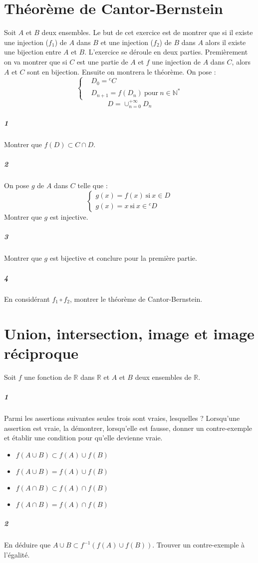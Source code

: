 \documentclass[10pt,a4paper]{article}
\begin{document}
\section{Théorème de Cantor-Bernstein}
Soit $A$ et $B$ deux ensembles. Le but de cet exercice est de montrer que si il existe une injection ($f_1$) de $A$ dans $B$ et une injection ($f_2$) de $B$ dans $A$ alors il existe une bijection entre $A$ et $B$. L'exercice se déroule en deux parties. Premièrement on va montrer que si $C$ est une partie de $A$ et $f$ une injection de $A$ dans $C$, alors $A$ et $C$ sont en bijection. Ensuite on montrera le théorème. On pose :
\begin{equation*}
\left\{
\begin{aligned}
&D_0={}^c C \\
&D_{n+1}=f(D_n) \ \text{pour} \ n \in \mathbb{N}^{*}
\end{aligned}\right.
\end{equation*}
\begin{equation*}
D=\cup_{n=0}^{+\infty} D_n
\end{equation*}
\subparagraph{1}Montrer que $f(D) \subset C \cap D$.
\subparagraph{2}On pose $g$ de $A$ dans $C$ telle que :
\begin{equation*}
\left\{
\begin{aligned}
g(x)=f(x) \ \text{si} \ x \in D \\
g(x)=x \ \text{si} \ x \in {}^cD
\end{aligned}\right.
\end{equation*}
Montrer que $g$ est injective.
\subparagraph{3}Montrer que $g$ est bijective et conclure pour la première partie.
\subparagraph{4}En considérant $f_1 \circ f_2$, montrer le théorème de Cantor-Bernstein.

\section{Union, intersection, image et image réciproque}
Soit $f$ une fonction de $\mathbb{R}$ dans $\mathbb{R}$ et $A$ et $B$ deux ensembles de $\mathbb{R}$.
\subparagraph{1} Parmi les assertions suivantes seules trois sont vraies, lesquelles ? Lorsqu'une assertion est vraie, la démontrer, lorsqu'elle est fausse, donner un contre-exemple et établir une condition pour qu'elle devienne vraie.
\begin{itemize}
\item $f(A \cup B) \subset f(A) \cup f(B)$
\item $f(A \cup B) = f(A) \cup f(B)$
\item $f(A \cap B) \subset f(A) \cap f(B)$
\item $f(A \cap B) = f(A) \cap f(B)$
\end{itemize}
\subparagraph{2}En déduire que $ A \cup B\subset f^{-1}(f(A) \cup f(B))$. Trouver un contre-exemple à l'égalité.
\end{document}
